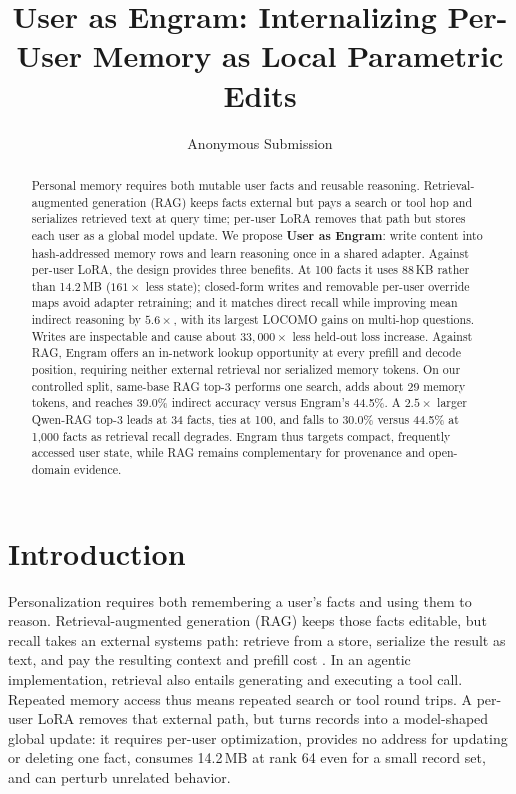 \documentclass[letterpaper]{article} %
\title{User as Engram: Internalizing Per-User Memory as Local Parametric Edits}
\author{
    Anonymous Submission
}
\begin{document}
\maketitle

\begin{abstract}
Personal memory requires both mutable user facts and reusable reasoning.
Retrieval-augmented generation (RAG) keeps facts external but pays a search or
tool hop and serializes retrieved text at query time; per-user LoRA removes that
path but stores each user as a global model update. We propose \textbf{User as
Engram}: write content into hash-addressed memory rows and learn reasoning once
in a shared adapter. Against per-user LoRA, the design provides three benefits.
At 100 facts it uses 88\,KB rather than 14.2\,MB ($161\times$ less state);
closed-form writes and removable per-user override maps avoid adapter
retraining; and it
matches direct recall while improving mean indirect reasoning by $5.6\times$,
with its largest LOCOMO gains on multi-hop questions. Writes are inspectable
and cause about $33{,}000\times$ less held-out loss increase. Against RAG,
Engram offers an in-network lookup opportunity at every prefill and decode
position, requiring neither external retrieval nor serialized memory tokens.
On our controlled split, same-base RAG top-3 performs one search, adds about 29
memory tokens, and reaches 39.0\% indirect accuracy versus Engram's 44.5\%.
A $2.5\times$ larger Qwen-RAG top-3 leads at 34 facts, ties at 100, and falls to
30.0\% versus 44.5\% at 1,000 facts as retrieval recall degrades. Engram thus
targets compact, frequently accessed user state, while RAG remains
complementary for provenance and open-domain evidence.
\end{abstract}

\section{Introduction}
\label{sec:intro}

Personalization requires both remembering a user's facts and using them to
reason. Retrieval-augmented generation (RAG) keeps those facts editable, but
recall takes an external systems path: retrieve from a store, serialize the
result as text, and pay the resulting context and prefill cost
\citep{lewis2020rag,gao2023ragsurvey}. In an agentic implementation, retrieval
also entails generating and executing a tool call. Repeated memory access thus
means repeated search or tool round trips. A per-user LoRA
\citep{hu2022lora} removes that external path, but turns records into a
model-shaped global update: it requires per-user optimization, provides no
address for updating or deleting one fact, consumes 14.2\,MB at rank 64 even
for a small record set, and can perturb unrelated behavior.
\end{document}
